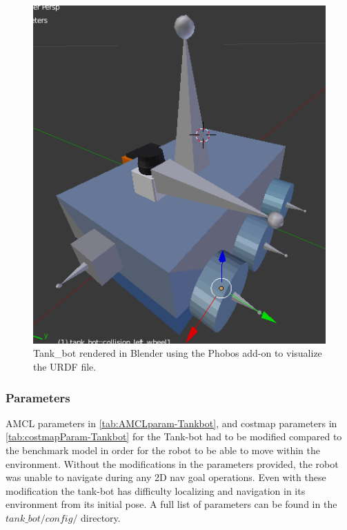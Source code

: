 \documentclass[10pt,journal,compsoc]{IEEEtran}
\begin{document}
\begin{figure}[thpb]
    \centering
    \includegraphics[width=\linewidth]{../img/urdf_tank_bot.png}
    \caption{Tank\_bot rendered in Blender using the Phobos add-on to visualize the URDF file.}
    \label{fig:tank-bot-design}
\end{figure}

\subsubsection{Parameters}

AMCL parameters in \ref{tab:AMCLparam-Tankbot}, and costmap parameters in \ref{tab:costmapParam-Tankbot} for the Tank-bot had to be modified compared to the benchmark model in order for the robot to be able to move within the environment. Without the modifications in the parameters provided, the robot was unable to navigate during any 2D nav goal operations. Even with these modification the tank-bot has difficulty localizing and navigation in its environment from its initial pose. A full list of parameters can be found in the \textit{$tank\_bot/config/$} directory.
\end{document}
